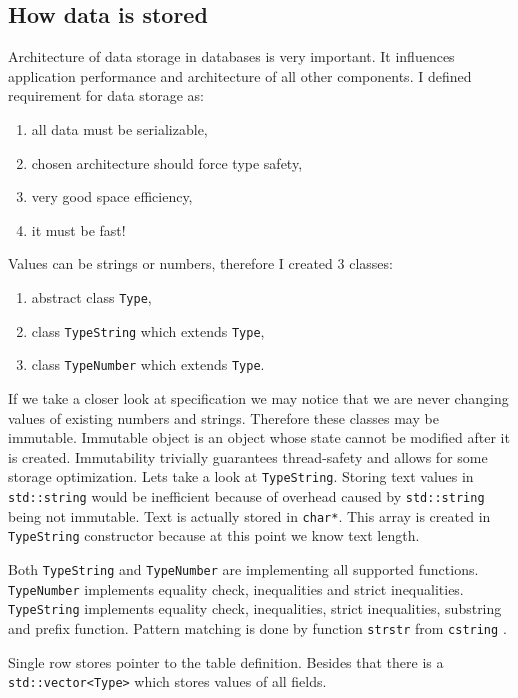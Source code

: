 \documentclass[10pt,a4paper]{article}
\begin{document}
\subsection{How data is stored}

Architecture of data storage in databases is very important. It influences application performance and architecture of all other components. I defined requirement for data storage as: 
\begin{enumerate}
\item all data must be serializable,
\item chosen architecture should force type safety,
\item very good space efficiency,
\item it must be fast!
\end{enumerate}
Values can be strings or numbers, therefore I created 3 classes:
\begin{enumerate}
\item abstract class \verb|Type|,
\item class \verb|TypeString| which extends \verb|Type|,
\item class \verb|TypeNumber| which extends \verb|Type|.
\end{enumerate}

If we take a closer look at specification we may notice that we are never changing values of existing numbers and strings. Therefore these classes may be immutable. Immutable object is an object whose state cannot be modified after it is created. Immutability trivially guarantees thread-safety and allows for some storage optimization. Lets take a look at \verb|TypeString|. Storing text values in \verb|std::string| would be inefficient because of overhead caused by \verb|std::string| being not immutable. Text is actually stored in \verb|char*|. This array is created in \verb|TypeString| constructor because at this point we know text length.   

Both \verb|TypeString| and \verb|TypeNumber| are implementing all supported functions. \verb|TypeNumber| implements equality check, inequalities and strict inequalities. \verb|TypeString| implements equality check, inequalities, strict inequalities, substring and prefix function. Pattern matching is done by function \verb|strstr| from \verb|cstring| \cite{STRSTR}.

Single row stores pointer to the table definition. Besides that there is a \verb|std::vector<Type>| which stores values of all fields.
\end{document}
